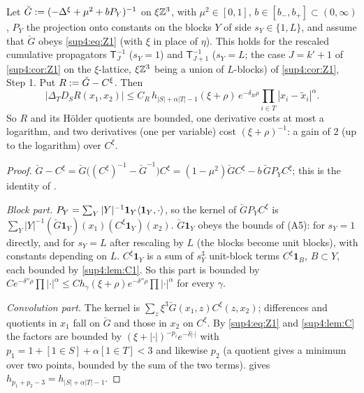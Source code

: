 \begin{lemma}[cumulative minus free: the gain of the resolvent comparison, $d=3$]\label{sup4:lem:R}
Let $\breve G:=(-\Delta^\xi+\mu^2+bP_Y)^{-1}$ on $\xi\mathbb Z^3$, with $\mu^2\in[0,1]$, $b\in[b_-,b_+]\subset(0,\infty)$, $P_Y$ the projection onto constants on the blocks $Y$ of side $s_Y\in\{1,L\}$, and assume that $\breve G$ obeys \eqref{sup4:eq:Z1} (with $\xi$ in place of $\eta$). This holds for the rescaled cumulative propagators $\mathsf T_J^{-1}$ ($s_Y=1$) and $\mathsf T_{J+1}^{-1}$ ($s_Y=L$; the case $J=k'+1$ of \cref{sup4:cor:Z1} on the $\xi$-lattice, $\xi\mathbb Z^3$ being a union of $L$-blocks) of \cref{sup4:cor:Z1}, Step 1. Put $R:=\breve G-C^\xi$. Then
\begin{equation}\label{sup4:eq:R}
|\Delta_TD_SR(x_1,x_2)|\le C_R\,h_{|S|+\alpha|T|-1}(\xi+\rho)\,e^{-\delta_R\rho}\prod_{i\in T}|x_i-\tilde x_i|^\alpha .
\end{equation}
So $R$ and its H\"older quotients are bounded, one derivative costs at most a logarithm, and two derivatives (one per variable) cost $(\xi+\rho)^{-1}$: a gain of $2$ (up to the logarithm) over $C^\xi$.
\end{lemma}

\begin{proof}
$\breve G-C^\xi=\breve G\big((C^\xi)^{-1}-\breve G^{-1}\big)C^\xi=(1-\mu^2)\breve GC^\xi-b\,\breve GP_YC^\xi$; this is the identity of \cite[p.~437]{Ba3}.

\emph{Block part.} $P_Y=\sum_Y|Y|^{-1}\mathbf 1_Y\langle \mathbf 1_Y,\cdot\rangle$, so the kernel of $\breve GP_YC^\xi$ is $\sum_Y|Y|^{-1}(\breve G\mathbf 1_Y)(x_1)(C^\xi\mathbf 1_Y)(x_2)$. $\breve G\mathbf 1_Y$ obeys the bounds of (A5): for $s_Y=1$ directly, and for $s_Y=L$ after rescaling by $L$ (the blocks become unit blocks), with constants depending on $L$. $C^\xi\mathbf 1_Y$ is a sum of $s_Y^3$ unit-block terms $C^\xi\mathbf 1_B$, $B\subset Y$, each bounded by \cref{sup4:lem:C1}. So this part is bounded by $Ce^{-\delta''\rho}\prod|\cdot|^\alpha\le Ch_\gamma(\xi+\rho)e^{-\delta''\rho}\prod|\cdot|^\alpha$ for every $\gamma$.

\emph{Convolution part.} The kernel is $\sum_z\xi^3\breve G(x_1,z)C^\xi(z,x_2)$; differences and quotients in $x_1$ fall on $\breve G$ and those in $x_2$ on $C^\xi$. By \eqref{sup4:eq:Z1} and \cref{sup4:lem:C} the factors are bounded by $(\xi+|\cdot|)^{-p_i}e^{-\delta|\cdot|}$ with $p_1=1+[1\in S]+\alpha[1\in T]<3$ and likewise $p_2$ (a quotient gives a minimum over two points, bounded by the sum of the two terms).  gives $h_{p_1+p_2-3}=h_{|S|+\alpha|T|-1}$.
\end{proof}

